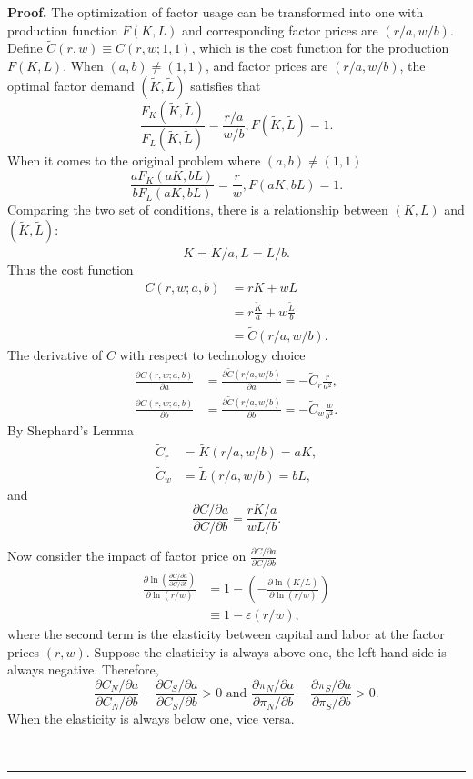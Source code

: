 \documentclass[notitlepage,11pt]{article}%
\newenvironment{proof}[1][Proof]{\noindent \textbf{#1.} }{\  \rule{0.5em}{0.5em}}
\begin{document}
\begin{proof}
The optimization of factor usage can be transformed into one with production
function $F\left(  K,L\right)  $ and corresponding factor prices are $\left(
r/a,w/b\right)  $. Define $\tilde{C}\left(  r,w\right)  \equiv C\left(
r,w;1,1\right)  $, which is the cost function for the production $F\left(
K,L\right)  $. When $\left(  a,b\right)  \neq\left(  1,1\right)  $, and factor
prices are $\left(  r/a,w/b\right)  $, the optimal factor demand $\left(
\tilde{K},\tilde{L}\right)  $ satisfies that%
\[
\frac{F_{K}\left(  \tilde{K},\tilde{L}\right)  }{F_{L}\left(  \tilde{K}%
,\tilde{L}\right)  }=\frac{r/a}{w/b},F\left(  \tilde{K},\tilde{L}\right)  =1.
\]
When it comes to the original problem where $\left(  a,b\right)  \neq\left(
1,1\right)  $%
\[
\frac{aF_{K}\left(  aK,bL\right)  }{bF_{L}\left(  aK,bL\right)  }=\frac{r}%
{w},F\left(  aK,bL\right)  =1.
\]
Comparing the two set of conditions, there is a relationship between $\left(
K,L\right)  $ and $\left(  \tilde{K},\tilde{L}\right)  $:
\[
K=\tilde{K}/a,L=\tilde{L}/b.
\]
Thus the cost function
\begin{align*}
C\left(  r,w;a,b\right)   &  =rK+wL\\
&  =r\frac{\tilde{K}}{a}+w\frac{\tilde{L}}{b}\\
&  =\tilde{C}\left(  r/a,w/b\right)  .
\end{align*}
The derivative of $C$ with respect to technology choice%
\begin{align*}
\frac{\partial C\left(  r,w;a,b\right)  }{\partial a}  &  =\frac
{\partial\tilde{C}\left(  r/a,w/b\right)  }{\partial a}=-\tilde{C}_{r}\frac
{r}{a^{2}},\\
\frac{\partial C\left(  r,w;a,b\right)  }{\partial b}  &  =\frac
{\partial\tilde{C}\left(  r/a,w/b\right)  }{\partial b}=-\tilde{C}_{w}\frac
{w}{b^{2}}.
\end{align*}
By Shephard's Lemma%
\begin{align*}
\tilde{C}_{r}  &  =\tilde{K}\left(  r/a,w/b\right)  =aK,\\
\tilde{C}_{w}  &  =\tilde{L}\left(  r/a,w/b\right)  =bL,
\end{align*}
and%
\[
\frac{\partial C/\partial a}{\partial C/\partial b}=\frac{rK/a}{wL/b}.
\]


Now consider the impact of factor price on $\frac{\partial C/\partial
a}{\partial C/\partial b}$
\begin{align*}
\frac{\partial\ln\left(  \frac{\partial C/\partial a}{\partial C/\partial
b}\right)  }{\partial\ln\left(  r/w\right)  }  &  =1-\left(  -\frac
{\partial\ln\left(  K/L\right)  }{\partial\ln\left(  r/w\right)  }\right) \\
&  \equiv1-\varepsilon\left(  r/w\right)  ,
\end{align*}
where the second term is the elasticity between capital and labor at the
factor prices $\left(  r,w\right)  $. Suppose the elasticity is always above
one, the left hand side is always negative. Therefore,
\[
\frac{\partial C_{N}/\partial a}{\partial C_{N}/\partial b}-\frac{\partial
C_{S}/\partial a}{\partial C_{S}/\partial b}>0\text{ and }\frac{\partial
\pi_{N}/\partial a}{\partial\pi_{N}/\partial b}-\frac{\partial\pi_{S}/\partial
a}{\partial\pi_{S}/\partial b}>0.
\]
When the elasticity is always below one, vice versa.


\end{proof}
\end{document}
